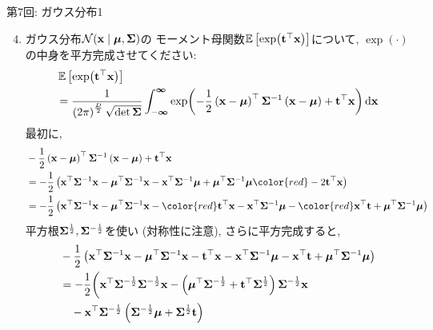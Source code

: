 \documentclass[dvipdfmx,notheorems,t]{beamer}
\begin{document}
\begin{frame}{第7回: ガウス分布1}
\begin{enumerate}
  \setcounter{enumi}{3}
  \item ガウス分布$\mathcal{N}(\vb{x} \mid \vb*{\mu}, \vb{\Sigma})$の
  モーメント母関数$\operatorname{\mathbb{E}} \left[ \exp(\vb{t}^\top \vb{x}) \right]$について,
  $\exp(\cdot)$の中身を平方完成させてください:
  \begin{align*}
    & \operatorname{\mathbb{E}} \left[ \exp(\vb{t}^\top \vb{x}) \right] \\
    &= \frac{1}{\left( 2\pi \right)^\frac{D}{2} \sqrt{\det \vb{\Sigma}}}
      \int_{-\boldsymbol{\infty}}^{\boldsymbol{\infty}}
      \exp(-\frac{1}{2} \left( \vb{x} - \vb*{\mu} \right)^\top \vb{\Sigma}^{-1}
        \left( \vb{x} - \vb*{\mu} \right) + \vb{t}^\top \vb{x}) \dd{\vb{x}}
  \end{align*}
  最初に,
  {\small \begin{align*}
    & -\frac{1}{2} \left( \vb{x} - \vb*{\mu} \right)^\top \vb{\Sigma}^{-1}
      \left( \vb{x} - \vb*{\mu} \right) + \vb{t}^\top \vb{x} \\
    &= -\frac{1}{2} \left( \vb{x}^\top \vb{\Sigma}^{-1} \vb{x}
      - \vb*{\mu}^\top \vb{\Sigma}^{-1} \vb{x}
      - \vb{x}^\top \vb{\Sigma}^{-1} \vb*{\mu}
      + \vb*{\mu}^\top \vb{\Sigma}^{-1} \vb*{\mu} {\color{red} - 2 \vb{t}^\top \vb{x}} \right) \\
    &= -\frac{1}{2} \left( \vb{x}^\top \vb{\Sigma}^{-1} \vb{x}
      - \vb*{\mu}^\top \vb{\Sigma}^{-1} \vb{x} - {\color{red} \vb{t}^\top \vb{x}}
      - \vb{x}^\top \vb{\Sigma}^{-1} \vb*{\mu} - {\color{red} \vb{x}^\top \vb{t}}
      + \vb*{\mu}^\top \vb{\Sigma}^{-1} \vb*{\mu} \right)
  \end{align*}}
  平方根$\vb{\Sigma}^{\frac{1}{2}}, \vb{\Sigma}^{-\frac{1}{2}}$を使い (対称性に注意), さらに平方完成すると,
  {\small \begin{align*}
    & -\frac{1}{2} \left( \vb{x}^\top \vb{\Sigma}^{-1} \vb{x}
      - \vb*{\mu}^\top \vb{\Sigma}^{-1} \vb{x} - \vb{t}^\top \vb{x}
      - \vb{x}^\top \vb{\Sigma}^{-1} \vb*{\mu} - \vb{x}^\top \vb{t}
      + \vb*{\mu}^\top \vb{\Sigma}^{-1} \vb*{\mu} \right) \\
    &= -\frac{1}{2} \bigg( \vb{x}^\top \vb{\Sigma}^{-\frac{1}{2}} \vb{\Sigma}^{-\frac{1}{2}} \vb{x}
      - \left( \vb*{\mu}^\top \vb{\Sigma}^{-\frac{1}{2}} + \vb{t}^\top \vb{\Sigma}^{\frac{1}{2}} \right)
        \vb{\Sigma}^{-\frac{1}{2}} \vb{x} \\
    & \quad - \vb{x}^\top \vb{\Sigma}^{-\frac{1}{2}}
        \left( \vb{\Sigma}^{-\frac{1}{2}} \vb*{\mu} + \vb{\Sigma}^{\frac{1}{2}} \vb{t} \right)

\end{align*}}
\end{enumerate}
\end{frame}
\end{document}
